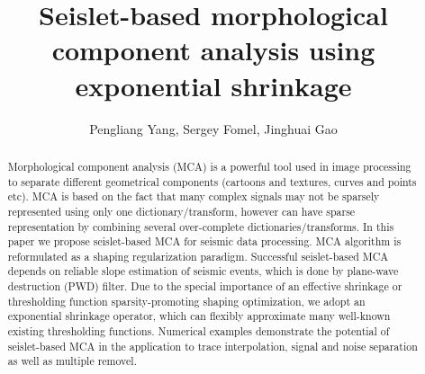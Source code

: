 \title{Seislet-based morphological component analysis using exponential shrinkage}

\renewcommand{\thefootnote}{\fnsymbol{footnote}}

\author{Pengliang Yang\footnotemark[1], Sergey Fomel\footnotemark[2], Jinghuai Gao\footnotemark[1]}


\address{
\footnotemark[1] Xi'an Jiaotong University\\
National Engineering Laboratory for Offshore Oil Exploration\\
Xi'an, China, 710049\\
\footnotemark[2] Bureau of Economic Geology,\\
John A. and Katherine G. Jackson School of Geosciences \\
The University of Texas at Austin \\
University Station, Box X \\
Austin, TX, USA, 78713-8924}



\maketitle

\begin{abstract}
Morphological component analysis (MCA) is a powerful tool used in image processing to separate different geometrical components (cartoons and textures, curves and points etc). MCA is based on the fact that many complex signals may not be sparsely represented using only one dictionary/transform, however can have sparse representation by combining several over-complete dictionaries/transforms. In this paper we propose seislet-based MCA for seismic data processing. MCA algorithm is reformulated as a shaping regularization paradigm. Successful seislet-based MCA depends on reliable slope estimation of seismic events, which is done by plane-wave destruction (PWD) filter. Due to the special importance of an effective shrinkage or thresholding function sparsity-promoting shaping optimization, we adopt an exponential shrinkage operator, which can flexibly  approximate many well-known existing thresholding functions. Numerical examples demonstrate the potential of seislet-based MCA in the application to trace interpolation, signal and noise separation as well as multiple removel.
\end{abstract}



